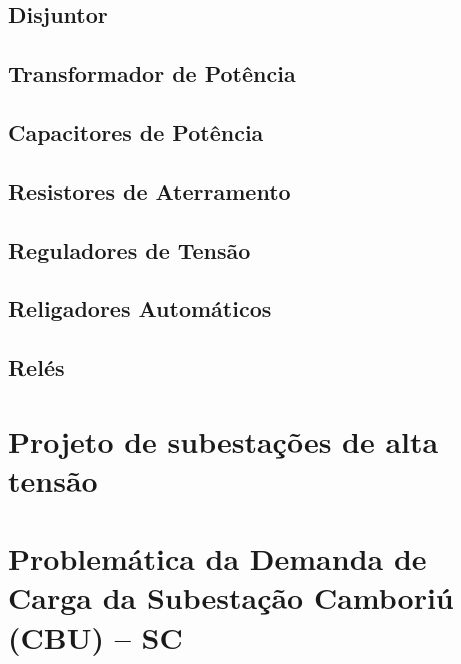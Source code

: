 	\section{Disjuntor}

	\section{Transformador de Potência}

	\section{Capacitores de Potência}

	\section{Resistores de Aterramento}

	\section{Reguladores de Tensão}

	\section{Religadores Automáticos}

	\section{Relés}



\chapter{Projeto de subestações de alta tensão}
\label{chap:projSEAT}
\textcolor{red}{\lipsum}

\chapter{Problemática da Demanda de Carga da Subestação Camboriú (CBU) -- SC}
\label{chap:demCarga}
\textcolor{red}{\lipsum}

